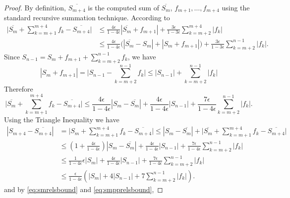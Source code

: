 \documentclass[12pt]{article}
\theoremstyle{definition}
\numberwithin{equation}{section}
\numberwithin{figure}{section}
\begin{document}
\begin{proof}
      By definition, $\overline{S_{m+4}}$ is the computed sum of
      $\overline{S_m}$, $f_{m+1}, \ldots, f_{m+4}$ using the standard recursive summation technique.
      According to \cite[Equation 1.2, 2.4]{higham}
      \begin{align*}
          \bigl|\overline{S_m} + \sum_{k=m+1}^{m+4}f_k - \overline{S_{m+4}}\bigr|
          & \leq \frac{4\epsilon}{1-4\epsilon} \left|\overline{S_m} + f_{m+1}\right| + \frac{3\epsilon}{1-3\epsilon} \sum_{k=m+2}^{m+4}|f_k| \\
          & \leq \frac{4\epsilon}{1-4\epsilon} \bigl(\left|\overline{S_m} - S_m\right| + |S_m + f_{m+1}|\bigr)
              + \frac{3\epsilon}{1-3\epsilon} \sum_{k=m+2}^{n-1}|f_k|.
      \end{align*}
      Since $S_{n-1} = S_m + f_{m+1} + \sum_{k=m+2}^{n-1} f_k$, we have
      \begin{equation*}
          |S_m + f_{m+1}|
          = \bigl|S_{n-1} - \sum_{k=m+2}^{n-1}f_k\bigr|
          \leq |S_{n-1}| + \sum_{k=m+2}^{n-1} |f_k|
      \end{equation*}
      Therefore
      \begin{equation*}
          \bigl|\overline{S_m} + \sum_{k=m+1}^{m+4}f_k - \overline{S_{m+4}}\bigr|
          \leq \frac{4\epsilon}{1-4\epsilon} \left|S_m - \overline{S_m}\right|
          + \frac{4\epsilon}{1-4\epsilon} |S_{n-1}|
          + \frac{7\epsilon}{1-4\epsilon} \sum_{k=m+2}^{n-1}|f_k|.
      \end{equation*}
      Using the Triangle Inequality we have
      \begin{align*}
      \left|S_{m+4} - \overline{S_{m+4}}\right|
          & = \bigl|S_m + \sum_{k=m+1}^{m+4}f_k - \overline{S_{m+4}}\bigr|
          \leq \left|S_m - \overline{S_m} \right| + \bigl|\overline{S_m} + \sum_{k=m+1}^{m+4}f_k - \overline{S_{m+4}} \bigr| \\
          & \leq \left(1 + \frac{4\epsilon}{1-4\epsilon}\right) \left|S_m - \overline{S_m}\right| + \frac{4\epsilon}{1-4\epsilon} |S_{n-1}|
                  + \frac{7\epsilon}{1-4\epsilon} \sum_{k=m+2}^{n-1}|f_k| \\
          & \leq \frac{1}{1-4\epsilon} \epsilon |S_m| + \frac{4\epsilon}{1-4\epsilon} |S_{n-1}|
                  + \frac{7\epsilon}{1-4\epsilon} \sum_{k=m+2}^{n-1}|f_k| \\
          & \leq \frac{\epsilon}{1-4\epsilon} \left(|S_m| + 4 |S_{n-1}|
                  + 7 \sum_{k=m+2}^{n-1}|f_k|\right).
      \end{align*}
      and by \eqref{eq:smrelsbound} and \eqref{eq:smpprelsbound},

\end{proof}
\end{document}
